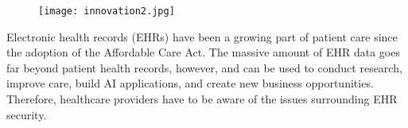 \documentclass[12pt,a4paper]{report}
\begin{document}
\begin{figure}
    \centering
    \texttt{[image: innovation2.jpg]}
\end{figure}

Electronic health records (EHRs) have been a growing part of patient care since the adoption of the Affordable Care Act. The massive amount of EHR data goes far beyond patient health records, however, and can be used to conduct research, improve care, build AI applications, and create new business opportunities. Therefore, healthcare providers have to be aware of the issues surrounding EHR security.\par
\end{document}
